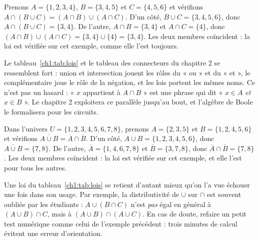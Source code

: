 \begin{exemple}
Prenons $A = \{1, 2, 3, 4\}$, $B = \{3, 4, 5\}$ et $C = \{4, 5, 6\}$ et vérifions $A \cap (B \cup C) = (A \cap B) \cup (A \cap C)$. D'un côté, $B \cup C = \{3, 4, 5, 6\}$, donc $A \cap (B \cup C) = \{3, 4\}$. De l'autre, $A \cap B = \{3, 4\}$ et $A \cap C = \{4\}$, donc $(A \cap B) \cup (A \cap C) = \{3, 4\} \cup \{4\} = \{3, 4\}$. Les deux membres coïncident : la loi est vérifiée sur cet exemple, comme elle l'est toujours.
\end{exemple}

\begin{remarque}
Le tableau~\ref{ch1:tab:lois} et le tableau des connecteurs du chapitre 2 se ressemblent fort : union et intersection jouent les rôles du « ou » et du « et », le complémentaire joue le rôle de la négation, et les lois portent les mêmes noms. Ce n'est pas un hasard : « $x$ appartient à $A \cap B$ » est une phrase qui dit « $x \in A$ \emph{et} $x \in B$ ». Le chapitre 2 exploitera ce parallèle jusqu'au bout, et l'algèbre de Boole le formalisera pour les circuits.
\end{remarque}

\begin{exemple}
Dans l'univers $U = \{1, 2, 3, 4, 5, 6, 7, 8\}$, prenons $A = \{2, 3, 5\}$ et $B = \{1, 2, 4, 5, 6\}$ et vérifions $\overline{A \cup B} = \overline{A} \cap \overline{B}$. D'un côté, $A \cup B = \{1, 2, 3, 4, 5, 6\}$, donc $\overline{A \cup B} = \{7, 8\}$. De l'autre, $\overline{A} = \{1, 4, 6, 7, 8\}$ et $\overline{B} = \{3, 7, 8\}$, donc $\overline{A} \cap \overline{B} = \{7, 8\}$. Les deux membres coïncident : la loi est vérifiée sur cet exemple, et elle l'est pour tous les autres.
\end{exemple}

\begin{remarque}
Une loi du tableau~\ref{ch1:tab:lois} se retient d'autant mieux qu'on l'a vue échouer une fois dans son usage. Par exemple, la distributivité de $\cup$ sur $\cap$ est souvent oubliée par les étudiants : $A \cup (B \cap C)$ n'est \emph{pas} égal en général à $(A \cup B) \cap C$, mais à $(A \cup B) \cap (A \cup C)$. En cas de doute, refaire un petit test numérique comme celui de l'exemple précédent : trois minutes de calcul évitent une erreur d'orientation.
\end{remarque}

